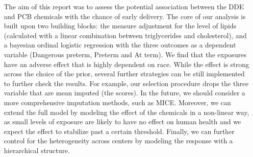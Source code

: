 The aim of this report was to assess the potential association between the DDE and PCB chemicals with the chance of early delivery. The core of our analysis is built upon two building blocks: the measure adjustment for the level of lipids (calculated with a linear combination between triglycerides and cholesterol), and a bayesian ordinal logistic regression with the three outcomes as a dependent variable (Dangerous preterm, Preterm and At term). We find that the exposures have an adverse  effect that is highly dependent on race. While the effect is strong across the choice of the prior, several further strategies can be still implemented to further check the results. For example, our selection procedure drops the three variable that are mean imputed (the scores). In the future, we should consider a more comprehensive imputation methods, such as MICE. Moreover, we can extend the full model by modeling  the effect of the chemicals in a non-linear way,  as small levels of exposure are likely to have no effect on human health and we expect the effect to stabilize past a certain threshold. Finally, we can further control for the heterogeneity across centers by modeling the response with a hierarchical structure.